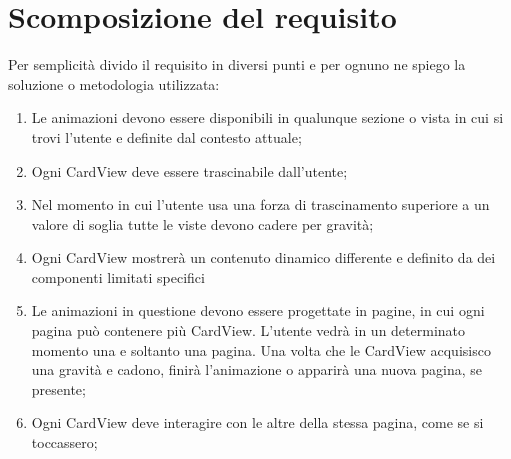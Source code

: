 

\section{Scomposizione del requisito}

Per semplicità divido il requisito in diversi punti e per ognuno ne spiego la soluzione
o metodologia utilizzata:

\begin{enumerate}
    \item\label{animationenum:1} Le animazioni devono essere disponibili in qualunque sezione o vista in cui si trovi l'utente e definite dal contesto attuale;

    \item\label{animationenum:2} Ogni CardView deve essere trascinabile dall'utente;
    
    \item\label{animationenum:3} Nel momento in cui l'utente usa una forza di trascinamento superiore a un valore di soglia tutte le viste devono
        cadere per gravità;

    \item\label{animationenum:4} Ogni CardView mostrerà un contenuto dinamico differente e definito da dei componenti
    limitati specifici

    \item\label{animationenum:5} Le animazioni in questione devono essere progettate in pagine, in cui ogni pagina può contenere 
    più CardView. L'utente vedrà in un determinato momento una e soltanto una pagina. 
    Una volta che le CardView acquisisco una gravità e cadono, finirà l'animazione o apparirà
    una nuova pagina, se presente;

    \item\label{animationenum:7} Ogni CardView deve interagire con le altre della stessa pagina, come se si toccassero;

\end{enumerate}

